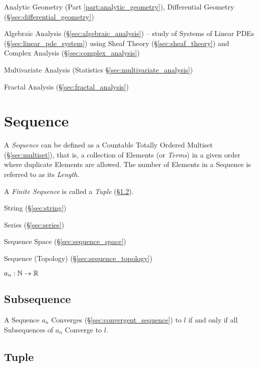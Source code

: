 \fist Analytic Geometry (Part \ref{part:analytic_geometry}), Differential
Geometry (\S\ref{sec:differential_geometry})

\fist Algebraic Analysis (\S\ref{sec:algebraic_analysis}) -- study of Systems of
Linear PDEs (\S\ref{sec:linear_pde_system}) using Sheaf Theory
(\S\ref{sec:sheaf_theory}) and Complex Analysis (\S\ref{sec:complex_analysis})

\fist Multivariate Analysis (Statistics \S\ref{sec:multivariate_analysis})

\fist Fractal Analysis (\S\ref{sec:fractal_analysis})



\section{Sequence}\label{sec:sequence}

A \emph{Sequence} can be defined as a Countable Totally Ordered
Multiset (\S\ref{sec:multiset}), that is, a collection of Elements (or
\emph{Terms}) in a given order where duplicate Elements are allowed.
The number of Elements in a Sequence is referred to as its
\emph{Length}.

A \emph{Finite Sequence} is called a \emph{Tuple} (\S\ref{sec:tuple}).

String (\S\ref{sec:string})

Series (\S\ref{sec:series})

Sequence Space (\S\ref{sec:sequence_space})

Sequence (Topology) (\S\ref{sec:sequence_topology})

$a_n : \mathbb{N} \rightarrow \mathbb{R}$



\subsection{Subsequence}\label{sec:subsequence}

A Sequence $a_n$ Converges (\S\ref{sec:convergent_sequence}) to $l$
if and only if all Subsequences of $a_n$ Converge to $l$.



\subsection{Tuple}\label{sec:tuple}

